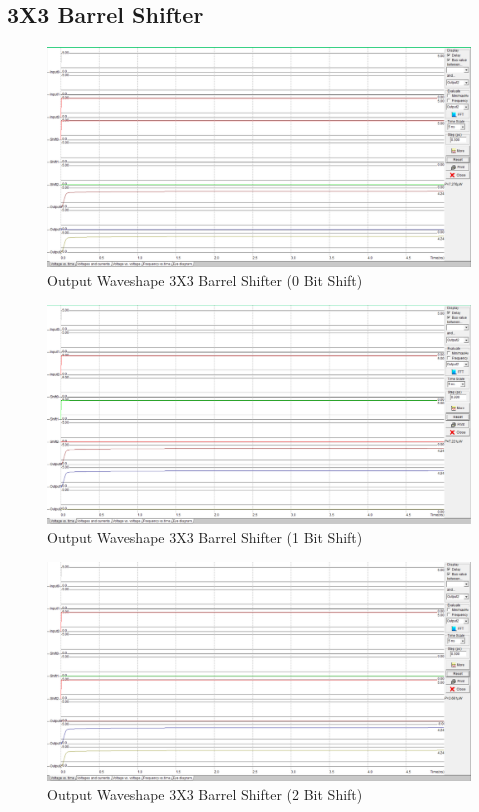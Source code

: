 \documentclass[a4paper,12pt]{article}
\begin{document}
	\subsection{3X3 Barrel Shifter}
		\begin{figure}[H]
		\centering
		\includegraphics[width=1\linewidth, height=.42\textheight]{Images/3bs0}
		\caption{Output Waveshape 3X3 Barrel Shifter (0 Bit Shift)}
		\label{fig:2b}
	\end{figure}
	
	\begin{figure}[H]
		\centering
		\includegraphics[width=1\linewidth, height=.42\textheight]{Images/3bs1}
		\caption{Output Waveshape 3X3 Barrel Shifter (1 Bit Shift)}
		\label{fig:2b}
	\end{figure}
	
	\begin{figure}[H]
		\centering
		\includegraphics[width=1\linewidth, height=.42\textheight]{Images/3bs2}
		\caption{Output Waveshape 3X3 Barrel Shifter (2 Bit Shift)}
		\label{fig:2b}
	\end{figure}
\end{document}
